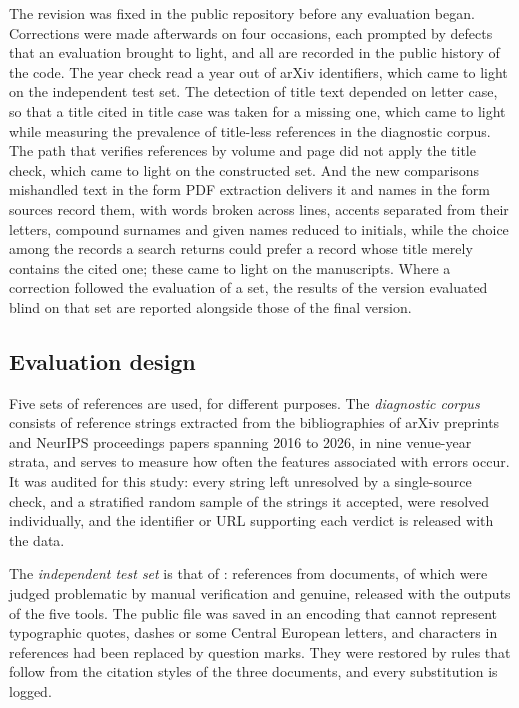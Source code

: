 \documentclass[pdflatex,sn-apa]{sn-jnl}
\begin{document}
The revision was fixed in the public repository before any evaluation began. Corrections were made afterwards on four occasions, each prompted by defects that an evaluation brought to light, and all are recorded in the public history of the code. The year check read a year out of arXiv identifiers, which came to light on the independent test set. The detection of title text depended on letter case, so that a title cited in title case was taken for a missing one, which came to light while measuring the prevalence of title-less references in the diagnostic corpus. The path that verifies references by volume and page did not apply the title check, which came to light on the constructed set. And the new comparisons mishandled text in the form PDF extraction delivers it and names in the form sources record them, with words broken across lines, accents separated from their letters, compound surnames and given names reduced to initials, while the choice among the records a search returns could prefer a record whose title merely contains the cited one; these came to light on the manuscripts. Where a correction followed the evaluation of a set, the results of the version evaluated blind on that set are reported alongside those of the final version.

\subsection{Evaluation design}
\label{sec:design}

Five sets of references are used, for different purposes. The \emph{diagnostic corpus} consists of \Nrefs{} reference strings extracted from the bibliographies of \Npapers{} arXiv preprints and NeurIPS proceedings papers spanning 2016 to 2026, in nine venue-year strata, and serves to measure how often the features associated with errors occur. It was audited for this study: every string left unresolved by a single-source check, and a stratified random sample of the strings it accepted, were resolved individually, and the identifier or URL supporting each verdict is released with the data.

The \emph{independent test set} is that of \citet{badalova2026data}: \IndN{} references from \IndDocs{} documents, of which \IndProb{} were judged problematic by manual verification and \IndGen{} genuine, released with the outputs of the five tools. The public file was saved in an encoding that cannot represent typographic quotes, dashes or some Central European letters, and \IndRestoredChars{} characters in \IndRestoredRefs{} references had been replaced by question marks. They were restored by rules that follow from the citation styles of the three documents, and every substitution is logged.
\end{document}

